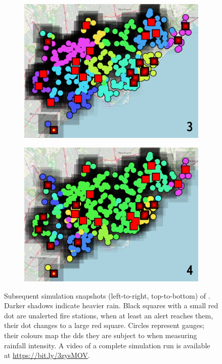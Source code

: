 \begin{figure}[t]
\begin{subfigure}[b]{0.49\linewidth}
    \includegraphics[width=\linewidth]{papers/ieee2022/img/snapshots/step-5.png-low.png}
  \end{subfigure}
  \hfill
  \begin{subfigure}[b]{0.49\linewidth}
    \centering
    \includegraphics[width=\linewidth]{papers/ieee2022/img/snapshots/step-6.png-low.png}
  \end{subfigure}
  \caption[\casename{} simulation snapshots]{
    Subsequent simulation snapshots (left-to-right, top-to-bottom) of \casename{}.
    Darker shadows indicate heavier rain.
    Black squares with a small red dot are unalerted fire stations,
    when at least an alert reaches them, their dot changes to a large red square.
    Circles represent gauges;
    their colours map the \acp{dd} they are subject to when measuring rainfall intensity.
    A video of a complete simulation run is available at \url{https://bit.ly/3zysMOV}.
  }
  \label{fig:simulation-plots}
\end{figure}

